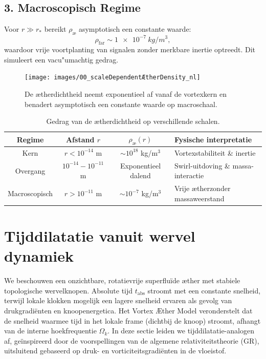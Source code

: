 \subsection*{3. Macroscopisch Regime}

Voor \( r \gg r_* \) bereikt \( \rho_\text{\ae} \) asymptotisch een constante waarde:
\begin{equation}
    \rho_\text{far} \sim \SI{1e-7}{kg/m^3},
\end{equation}
waardoor vrije voortplanting van signalen zonder merkbare inertie optreedt. Dit simuleert een vacu"umachtig gedrag.


\begin{figure}[htbp]
    \centering
    \texttt{[image: images/00\_scaleDependentÆtherDensity\_nl]}
    \caption{De ætherdichtheid neemt exponentieel af vanaf de vortexkern en benadert asymptotisch een constante waarde op macroschaal.}
    \label{fig:vortexfields2}
\end{figure}

\begin{table}[h!]
    \centering
    \begin{tabular}{|c|c|c|l|}
        \hline
        Regime & Afstand $r$ & $\rho_\text{\ae}(r)$ & Fysische interpretatie \\
        \hline
        Kern & $r < 10^{-14}$ m & $\sim 10^{18}$ kg/m$^3$ & Vortexstabiliteit \& inertie \\
        Overgang & $10^{-14} - 10^{-11}$ m & Exponentieel dalend & Swirl-uitdoving \& massa-interactie \\
        Macroscopisch & $r > 10^{-11}$ m & $\sim 10^{-7}$ kg/m$^3$ & Vrije ætherzonder massaweerstand \\
        \hline
    \end{tabular}
    \caption{Gedrag van de ætherdichtheid op verschillende schalen.}
\end{table}


\section{Tijddilatatie vanuit wervel dynamiek}

We beschouwen een onzichtbare, rotatievrije superfluïde æther met stabiele topologische wervelknopen. Absolute tijd $t_\text{abs}$ stroomt met een constante snelheid, terwijl lokale klokken mogelijk een lagere snelheid ervaren als gevolg van drukgradiënten en knoopenergetica. Het Vortex Æther Model veronderstelt dat de snelheid waarmee tijd in het lokale frame (dichtbij de knoop) stroomt, afhangt van de interne hoekfrequentie $\Omega_k$. In deze sectie leiden we tijddilatatie-analogen af, geïnspireerd door de voorspellingen van de algemene relativiteitstheorie (GR), uitsluitend gebaseerd op druk- en vorticiteitsgradiënten in de vloeistof.

